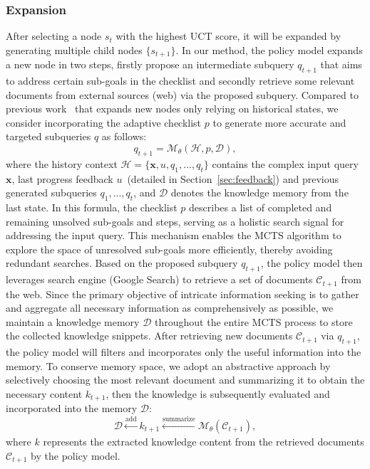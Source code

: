 \subsubsection{Expansion}
After selecting a node $s_t$ with the highest UCT score, it will be expanded by generating multiple child nodes $\{s_{t+1}\}$. In our method, the policy model expands a new node in two steps, \ie firstly propose an intermediate subquery $q_{t+1}$ that aims to address certain sub-goals in the checklist and secondly retrieve some relevant documents from external sources (\eg web) via the proposed subquery. Compared to previous work~\cite{quiet-star,zhang2024llama} that expands new nodes only relying on historical states, we consider incorporating the adaptive checklist $p$ to generate more accurate and targeted subqueries $q$ as follows:
\begin{equation}
    q_{t+1} = \mathcal{M}_\theta(\mathcal{H}, p, \mathcal{D}),
\end{equation}
where the history context $\mathcal{H} = \{ \bm{x}, u, q_1,..., q_t \}$ contains the complex input query $\bm{x}$, last progress feedback $u$~(detailed in Section~\ref{sec:feedback}) and previous generated subqueries $q_1,..., q_t$, and $\mathcal{D}$ denotes the knowledge memory from the last state. In this formula, the checklist $p$ describes a list of completed and remaining unsolved sub-goals and steps, serving as a holistic search signal for addressing the input query.
This mechanism enables the MCTS algorithm to explore the space of unresolved sub-goals more efficiently, thereby avoiding redundant searches. Based on the proposed subquery $q_{t+1}$, the policy model then leverages search engine (\eg Google Search) to retrieve a set of documents $\mathcal{C}_{t+1}$ from the web. Since the primary objective of intricate information seeking is to gather and aggregate all necessary information as comprehensively as possible, we maintain a knowledge memory $\mathcal{D}$ throughout the entire MCTS process to store the collected knowledge snippets. After retrieving new documents $\mathcal{C}_{t+1}$ via $q_{t+1}$, the policy model will filters and incorporates only the useful information into the memory. To conserve memory space, we adopt an abstractive approach by selectively choosing the most relevant document and summarizing it to obtain the necessary content $k_{t+1}$, then the knowledge is subsequently evaluated and incorporated into the memory $\mathcal{D}$:
\begin{equation}
    \mathcal{D} \xleftarrow[]{\text{add}} k_{t+1} \xleftarrow[]{\text{summarize}} \mathcal{M}_\theta(\mathcal{C}_{t+1}),
\end{equation}
where $k$ represents the extracted knowledge content from the retrieved documents $\mathcal{C}_{t+1}$ by the policy model.

